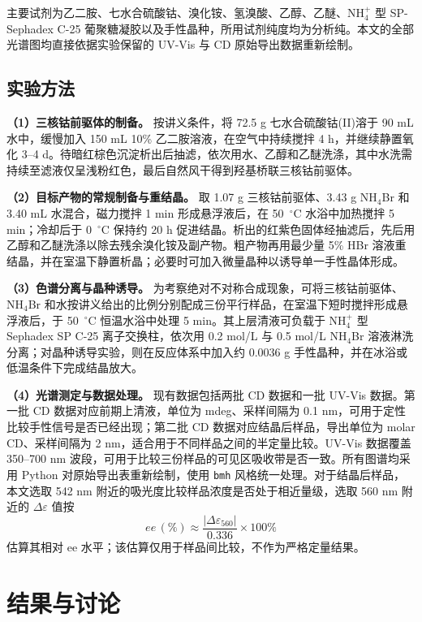 \documentclass[a4paper]{article}
\begin{document}
主要试剂为乙二胺、七水合硫酸钴、溴化铵、氢溴酸、乙醇、乙醚、NH$_4^+$ 型 SP-Sephadex C-25 葡聚糖凝胶以及手性晶种，所用试剂纯度均为分析纯。本文的全部光谱图均直接依据实验保留的 UV-Vis 与 CD 原始导出数据重新绘制。

\subsection{实验方法}

\textbf{（1）三核钴前驱体的制备。} 按讲义条件，将 72.5 g 七水合硫酸钴(II)溶于 90 mL 水中，缓慢加入 150 mL 10\% 乙二胺溶液，在空气中持续搅拌 4 h，并继续静置氧化 3--4 d。待暗红棕色沉淀析出后抽滤，依次用水、乙醇和乙醚洗涤，其中水洗需持续至滤液仅呈浅粉红色，最后自然风干得到羟基桥联三核钴前驱体\cite{teaching_lab}。

\textbf{（2）目标产物的常规制备与重结晶。} 取 1.07 g 三核钴前驱体、3.43 g NH$_4$Br 和 3.40 mL 水混合，磁力搅拌 1 min 形成悬浮液后，在 50~$^{\circ}$C 水浴中加热搅拌 5 min；冷却后于 0~$^{\circ}$C 保持约 20 h 促进结晶。析出的红紫色固体经抽滤后，先后用乙醇和乙醚洗涤以除去残余溴化铵及副产物。粗产物再用最少量 5\% HBr 溶液重结晶，并在室温下静置析晶；必要时可加入微量晶种以诱导单一手性晶体形成。

\textbf{（3）色谱分离与晶种诱导。} 为考察绝对不对称合成现象，可将三核钴前驱体、NH$_4$Br 和水按讲义给出的比例分别配成三份平行样品，在室温下短时搅拌形成悬浮液后，于 50~$^{\circ}$C 恒温水浴中处理 5 min。其上层清液可负载于 NH$_4^+$ 型 Sephadex SP C-25 离子交换柱，依次用 0.2 mol/L 与 0.5 mol/L NH$_4$Br 溶液淋洗分离；对晶种诱导实验，则在反应体系中加入约 0.0036 g 手性晶种，并在冰浴或低温条件下完成结晶放大\cite{teaching_lab}。

\textbf{（4）光谱测定与数据处理。} 现有数据包括两批 CD 数据和一批 UV-Vis 数据。第一批 CD 数据对应前期上清液，单位为 mdeg、采样间隔为 0.1 nm，可用于定性比较手性信号是否已经出现；第二批 CD 数据对应结晶后样品，导出单位为 molar CD、采样间隔为 2 nm，适合用于不同样品之间的半定量比较。UV-Vis 数据覆盖 350--700 nm 波段，可用于比较三份样品的可见区吸收带是否一致。所有图谱均采用 Python 对原始导出表重新绘制，使用 \texttt{bmh} 风格统一处理。对于结晶后样品，本文选取 542 nm 附近的吸光度比较样品浓度是否处于相近量级，选取 560 nm 附近的 $\Delta\varepsilon$ 值按
\[
	ee\,(\%) \approx \frac{|\Delta\varepsilon_{560}|}{0.336}\times 100\%
\]
估算其相对 ee 水平；该估算仅用于样品间比较，不作为严格定量结果。

\section{结果与讨论}
\vspace{-0.5em}
\end{document}
